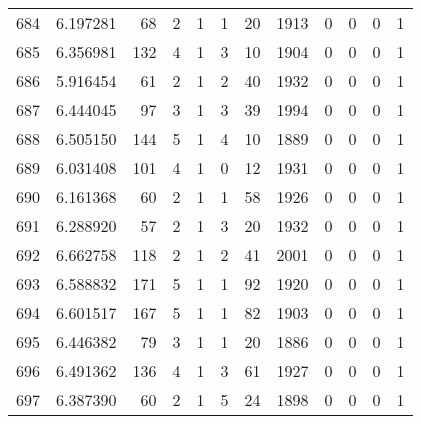 \begin{tabular}{lrrrrrrrrrrr}
684 &  6.197281 &   68 &      2 &        1 &      1 &              20 &  1913 &               0 &               0 &               0 &               1 \\
685 &  6.356981 &  132 &      4 &        1 &      3 &              10 &  1904 &               0 &               0 &               0 &               1 \\
686 &  5.916454 &   61 &      2 &        1 &      2 &              40 &  1932 &               0 &               0 &               0 &               1 \\
687 &  6.444045 &   97 &      3 &        1 &      3 &              39 &  1994 &               0 &               0 &               0 &               1 \\
688 &  6.505150 &  144 &      5 &        1 &      4 &              10 &  1889 &               0 &               0 &               0 &               1 \\
689 &  6.031408 &  101 &      4 &        1 &      0 &              12 &  1931 &               0 &               0 &               0 &               1 \\
690 &  6.161368 &   60 &      2 &        1 &      1 &              58 &  1926 &               0 &               0 &               0 &               1 \\
691 &  6.288920 &   57 &      2 &        1 &      3 &              20 &  1932 &               0 &               0 &               0 &               1 \\
692 &  6.662758 &  118 &      2 &        1 &      2 &              41 &  2001 &               0 &               0 &               0 &               1 \\
693 &  6.588832 &  171 &      5 &        1 &      1 &              92 &  1920 &               0 &               0 &               0 &               1 \\
694 &  6.601517 &  167 &      5 &        1 &      1 &              82 &  1903 &               0 &               0 &               0 &               1 \\
695 &  6.446382 &   79 &      3 &        1 &      1 &              20 &  1886 &               0 &               0 &               0 &               1 \\
696 &  6.491362 &  136 &      4 &        1 &      3 &              61 &  1927 &               0 &               0 &               0 &               1 \\
697 &  6.387390 &   60 &      2 &        1 &      5 &              24 &  1898 &               0 &               0 &               0 &               1 \\

\end{tabular}
